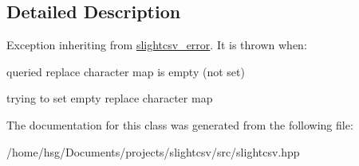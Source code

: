 \subsection{Detailed Description}
Exception inheriting from \hyperlink{classutils_1_1slightcsv__error}{slightcsv\+\_\+error}. It is thrown when\+:
\begin{DoxyItemize}
\item queried replace character map is empty (not set)
\item trying to set empty replace character map 
\end{DoxyItemize}

The documentation for this class was generated from the following file\+:\begin{DoxyCompactItemize}
\item 
/home/hsg/\+Documents/projects/slightcsv/src/slightcsv.\+hpp\end{DoxyCompactItemize}
